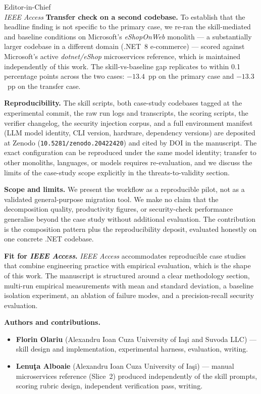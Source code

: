 \documentclass[11pt, a4paper]{letter}
\begin{document}
\begin{letter}{%
  Editor-in-Chief\\
  \textit{IEEE Access}
}
\textbf{Transfer check on a second codebase.}
To establish that the headline finding is not specific to the
primary case, we re-ran the skill-mediated and baseline conditions
on Microsoft's \textit{eShopOnWeb} monolith --- a substantially
larger codebase in a different domain (.NET~8 e-commerce) ---
scored against Microsoft's active \textit{dotnet/eShop}
microservices reference, which is maintained independently of
this work.  The skill-vs-baseline gap replicates to within
0.1 percentage points across the two cases: $-13.4$~pp on the
primary case and $-13.3$~pp on the transfer case.

\textbf{Reproducibility.}
The skill scripts, both case-study codebases tagged at the
experimental commit, the raw run logs and transcripts, the scoring
scripts, the verifier changelog, the security injection corpus, and
a full environment manifest (LLM model identity, CLI version,
hardware, dependency versions) are deposited at Zenodo
(\texttt{10.5281/zenodo.20422420}) and cited by DOI in the
manuscript.  The exact configuration can be reproduced
under the same model identity; transfer to other monoliths,
languages, or models requires re-evaluation, and we discuss the
limits of the case-study scope explicitly in the threats-to-validity
section.

\textbf{Scope and limits.}
We present the workflow as a reproducible pilot, not as a validated
general-purpose migration tool.  We make no claim that the decomposition
quality, productivity figures, or security-check performance generalise
beyond the case study without additional evaluation.  The contribution
is the composition pattern plus the reproducibility deposit, evaluated
honestly on one concrete .NET codebase.

\textbf{Fit for \textit{IEEE Access}.}
\textit{IEEE Access} accommodates reproducible case studies that
combine engineering practice with empirical evaluation, which is the
shape of this work.  The manuscript is structured around a clear
methodology section, multi-run empirical measurements with mean and
standard deviation, a baseline isolation experiment, an ablation
of failure modes, and a precision-recall security evaluation.

\textbf{Authors and contributions.}
\begin{itemize}
  \item \textbf{Florin Olariu} (Alexandru Ioan Cuza University of
    Ia\c{s}i and Suvoda LLC) --- skill design and implementation,
    experimental harness, evaluation, writing.
  \item \textbf{Lenu\c{t}a Alboaie} (Alexandru Ioan Cuza University of
    Ia\c{s}i) --- manual microservices reference (Slice~2) produced
    independently of the skill prompts, scoring rubric design,
    independent verification pass, writing.
\end{itemize}


\end{letter}
\end{document}
